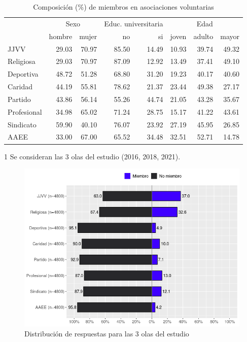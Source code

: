 \begin{table}[H]
\centering
\begin{threeparttable}
\caption{\label{demo-table} Composición (\%) de miembros en asociaciones voluntarias}
\centering
\begin{tabular}{lrrrrrrr}
\toprule
\multicolumn{1}{c}{ } & \multicolumn{2}{c}{Sexo} & \multicolumn{2}{c}{Educ. universitaria} & \multicolumn{3}{c}{Edad} \\
\cmidrule(l{3pt}r{3pt}){2-3} \cmidrule(l{3pt}r{3pt}){4-5} \cmidrule(l{3pt}r{3pt}){6-8}
  & hombre & mujer & no & si & joven & adulto & mayor\\
\midrule
JJVV & 29.03 & 70.97 & 85.50 & 14.49 & 10.93 & 39.74 & 49.32\\
Religiosa & 29.03 & 70.97 & 87.09 & 12.92 & 13.49 & 37.41 & 49.10\\
Deportiva & 48.72 & 51.28 & 68.80 & 31.20 & 19.23 & 40.17 & 40.60\\
Caridad & 44.19 & 55.81 & 78.62 & 21.37 & 23.44 & 49.38 & 27.17\\
Partido & 43.86 & 56.14 & 55.26 & 44.74 & 21.05 & 43.28 & 35.67\\
\addlinespace
Profesional & 34.98 & 65.02 & 71.24 & 28.75 & 15.17 & 41.22 & 43.61\\
Sindicato & 59.90 & 40.10 & 76.07 & 23.92 & 27.19 & 45.95 & 26.85\\
AAEE & 33.00 & 67.00 & 65.52 & 34.48 & 32.51 & 52.71 & 14.78\\
\bottomrule
\end{tabular}
\begin{tablenotes}
    \item[1] Se consideran las 3 olas del estudio (2016, 2018, 2021).
  \end{tablenotes}
\end{threeparttable}
\end{table}



\begin{figure}[htp]
    \centering
    \includegraphics[width=13cm]{output/plot_items.png}
    \caption{Distribución de respuestas para las 3 olas del estudio}
    \label{fig:galaxy}
\end{figure}



